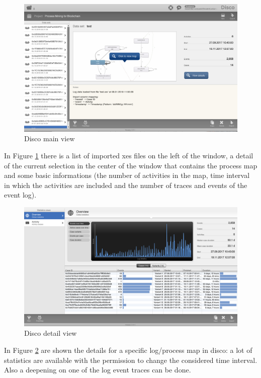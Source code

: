 \begin{figure}[!ht]
    \centering
\includegraphics[width=\textwidth]{images/disco_screen.png}
    \caption{Disco main view}
    \label{images:disco_screen}
\end{figure}

In Figure \ref{images:disco_screen} there is a list of imported xes files on the left of the window, a detail of the current 
selection in the center of the window that contains the process map and some basic informations (the number of activities in 
the map, time interval in which the activities are included and the number of traces and events of the event log).

\begin{figure}[!ht]
    \centering
\includegraphics[width=\textwidth]{images/disco_screen_detail.png}
    \caption{Disco detail view}
    \label{images:disco_screen_detail}
\end{figure}

In Figure \ref{images:disco_screen_detail} are shown the details for a specific log/process map in disco: a lot of statistics 
are available with the permission to change the considered time interval. Also a deepening on one of the log event traces can be 
done.